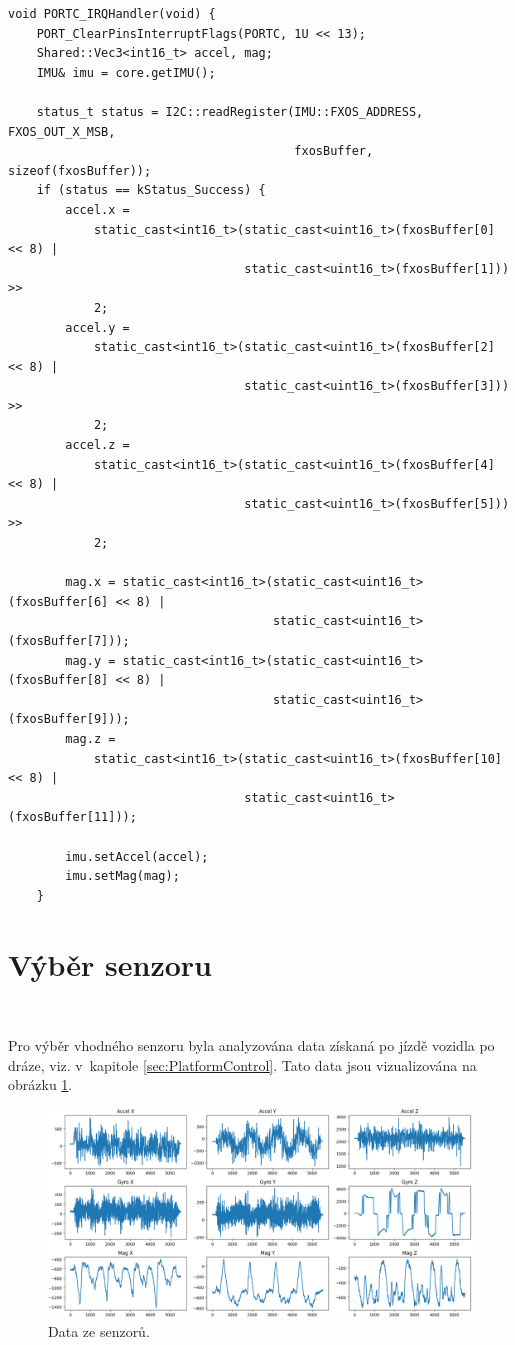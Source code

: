 \begin{lstlisting}[caption = Funkce obsluhy přerušení na portu C, label = lst:interruptC]
void PORTC_IRQHandler(void) {
    PORT_ClearPinsInterruptFlags(PORTC, 1U << 13);
    Shared::Vec3<int16_t> accel, mag;
    IMU& imu = core.getIMU();

    status_t status = I2C::readRegister(IMU::FXOS_ADDRESS, FXOS_OUT_X_MSB,
                                        fxosBuffer, sizeof(fxosBuffer));
    if (status == kStatus_Success) {
        accel.x =
            static_cast<int16_t>(static_cast<uint16_t>(fxosBuffer[0] << 8) |
                                 static_cast<uint16_t>(fxosBuffer[1])) >>
            2;
        accel.y =
            static_cast<int16_t>(static_cast<uint16_t>(fxosBuffer[2] << 8) |
                                 static_cast<uint16_t>(fxosBuffer[3])) >>
            2;
        accel.z =
            static_cast<int16_t>(static_cast<uint16_t>(fxosBuffer[4] << 8) |
                                 static_cast<uint16_t>(fxosBuffer[5])) >>
            2;

        mag.x = static_cast<int16_t>(static_cast<uint16_t>(fxosBuffer[6] << 8) |
                                     static_cast<uint16_t>(fxosBuffer[7]));
        mag.y = static_cast<int16_t>(static_cast<uint16_t>(fxosBuffer[8] << 8) |
                                     static_cast<uint16_t>(fxosBuffer[9]));
        mag.z =
            static_cast<int16_t>(static_cast<uint16_t>(fxosBuffer[10] << 8) |
                                 static_cast<uint16_t>(fxosBuffer[11]));

        imu.setAccel(accel);
        imu.setMag(mag);
    }
\end{lstlisting}

\section{Výběr senzoru}\

Pro výběr vhodného senzoru byla analyzována data získaná po jízdě vozidla po dráze,
viz. v~kapitole \ref{sec:PlatformControl}. Tato data jsou vizualizována na obrázku
\ref{fig:Sensors}.
\begin{figure}[!h]
    \centering
    \includegraphics[width = 1\linewidth]{Figures/Sensors.png}
    \caption{Data ze senzorů.}
    \label{fig:Sensors}
\end{figure}

